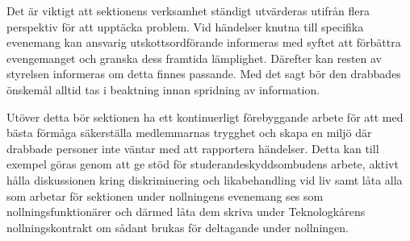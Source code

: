 \documentclass[../_main/handlingar.tex]{subfiles}
\begin{document}
Det är viktigt att sektionens verksamhet ständigt utvärderas utifrån flera perspektiv för att upptäcka problem. Vid händelser knutna till specifika evenemang kan ansvarig utskottsordförande informeras med syftet att förbättra evengemanget och granska dess framtida lämplighet. Därefter kan resten av styrelsen informeras om detta finnes passande. Med det sagt bör den drabbades önskemål alltid tas i beaktning innan spridning av information.  

Utöver detta bör sektionen ha ett kontinuerligt förebyggande arbete för att med bästa förmåga säkerställa medlemmarnas trygghet och skapa en miljö där drabbade personer inte väntar med att rapportera händelser. Detta kan till exempel göras genom att ge stöd för studerandeskyddsombudens arbete, aktivt hålla diskussionen kring diskriminering och likabehandling vid liv samt låta alla som arbetar för sektionen under nollningens evenemang ses som nollningsfunktionärer och därmed låta dem skriva under Teknologkårens nollningskontrakt om sådant brukas för deltagande under nollningen.

\newpage
\end{document}
